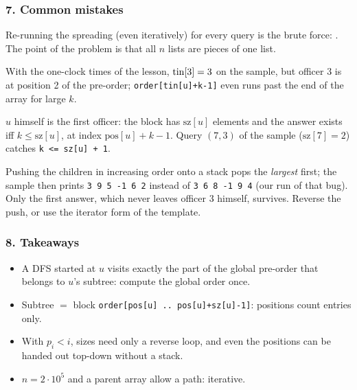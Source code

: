 \subsubsection*{7. Common mistakes}

\begin{warningbox}
Re-running the spreading (even iteratively) for every query is the brute force: . The point of the problem is that all $n$ lists are pieces of one list.
\end{warningbox}

\begin{warningbox}
With the one-clock times of the lesson, $\mathrm{tin}[3] = 3$ on the sample, but officer 3 is at position 2 of the pre-order; \texttt{order[tin[u]+k-1]} even runs past the end of the array for large $k$.
\end{warningbox}

\begin{warningbox}
$u$ himself is the first officer: the block has $\mathrm{sz}[u]$ elements and the answer exists iff $k \le \mathrm{sz}[u]$, at index $\mathrm{pos}[u] + k - 1$. Query $(7, 3)$ of the sample ($\mathrm{sz}[7] = 2$) catches \texttt{k <= sz[u] + 1}.
\end{warningbox}

\begin{warningbox}
Pushing the children in increasing order onto a stack pops the \emph{largest} first; the sample then prints \texttt{3 9 5 -1 6 2} instead of \texttt{3 6 8 -1 9 4} (our run of that bug). Only the first answer, which never leaves officer 3 himself, survives. Reverse the push, or use the iterator form of the template.
\end{warningbox}

\subsubsection*{8. Takeaways}

\begin{itemize}[leftmargin=*]
    \item A DFS started at $u$ visits exactly the part of the global pre-order that belongs to $u$'s subtree: compute the global order once.
    \item Subtree $=$ block \texttt{order[pos[u] .. pos[u]+sz[u]-1]}: positions count entries only.
    \item With $p_i < i$, sizes need only a reverse loop, and even the positions can be handed out top-down without a stack.
    \item $n = 2\cdot10^5$ and a parent array allow a path: iterative.
\end{itemize}

